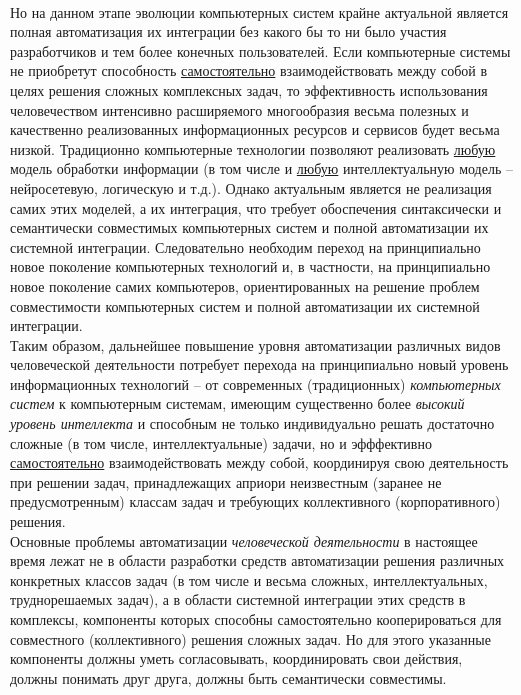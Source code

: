 \begin{scnsubstruct}
{        ~\\Но на данном этапе эволюции компьютерных систем крайне актуальной является полная автоматизация их интеграции без какого бы то ни было участия разработчиков и тем более конечных пользователей. Если компьютерные системы не приобретут способность \uline{самостоятельно} взаимодействовать между собой в целях решения сложных комплексных задач, то эффективность использования человечеством интенсивно расширяемого многообразия весьма полезных и качественно реализованных информационных ресурсов и сервисов будет весьма низкой. Традиционно компьютерные технологии позволяют реализовать \uline{любую} модель обработки информации (в том числе и \uline{любую} интеллектуальную модель -- нейросетевую, логическую и т.д.). Однако актуальным является не реализация самих этих моделей, а их интеграция, что требует обоспечения синтаксически и семантически совместимых компьютерных систем и полной автоматизации их системной интеграции. Следовательно необходим переход на принципиально новое поколение компьютерных технологий и, в частности, на принципиально новое поколение самих компьютеров, ориентированных на решение проблем совместимости компьютерных систем и полной автоматизации их системной интеграции.
        ~\\Таким образом, дальнейшее повышение уровня автоматизации различных видов человеческой деятельности потребует перехода на принципиально новый уровень информационных технологий -- от современных (традиционных) \textit{компьютерных систем} к компьютерным системам, имеющим существенно более \textit{высокий уровень интеллекта} и способным не только индивидуально решать достаточно сложные (в том числе, интеллектуальные) задачи, но и эфффективно \uline{самостоятельно} взаимодействовать между собой, координируя свою деятельность при решении задач, принадлежащих априори неизвестным (заранее не предусмотренным) классам задач и требующих коллективного (корпоративного) решения.
        ~\\Основные проблемы автоматизации \textit{человеческой деятельности} в настоящее время лежат не в области разработки средств автоматизации решения различных конкретных классов задач (в том числе и весьма сложных, интеллектуальных, труднорешаемых задач), а в области системной интеграции этих средств в комплексы, компоненты которых способны самостоятельно кооперироваться для совместного (коллективного) решения сложных задач. Но для этого указанные компоненты должны уметь согласовывать, координировать свои действия, должны понимать друг друга, должны быть семантически совместимы.}

\end{scnsubstruct}
